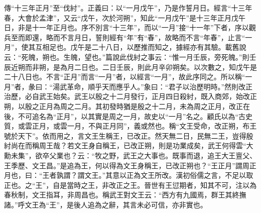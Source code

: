 {\noindent\zhuan{}\fzbyks 傳“十三年正月”至“伐紂”。正義曰：以“一月戊午”，乃是作誓月日。經言“十三年春，大會於孟津”，又云“戊午，次於河朔”，知此“一月戊午”是十三年正月戊午日，非是十一年正月也。序不別言“十三年”，而以“一月”接“十一年”下者，序以觀兵至而即還，略而不言月日，誓則經有“年”有“春”，故略而不言“年春”，止言“一月”，使其互相足也。戊午是二十八日，以歷推而知之，據經亦有其驗。載舊說云：“死魄，朔也。生魄，望也。”篇說此伐紂之事云：“惟一月壬辰，旁死魄。”則壬辰近朔而非朔，是為月二日也。二日壬辰，則此月辛卯朔矣。以次數之，知戊午是二十八日也。不言“正月”而言“一月”者，以經言“一月”，故此序同之。所以稱“一月”者，彖曰：“湯武革命，順乎天而應乎人。”象曰：“君子以治歷明時。”然則改正治歷，必自武王始矣。武王以殷之十二月發行，正月四日殺紂，既入商郊，始改正朔，以殷之正月為周之二月。其初發時猶是殷之十二月，未為周之正月，改正在後，不可追名為“正月”，以其實是周之一月，故史以“一月”名之。顧氏以為“古史質，或雲正月，或雲一月，不與正月同”，義或然也。稱“文王受命，改正朔，布王號於天下”。依而用之，言文王生稱王，已改正。然天無二日，民無二王，豈得殷紂尚在而稱周王哉？若文王身自稱王，已改正朔，則是功業成矣，武王何得雲“大勳未集”，欲卒父業也？云：“牧之野，武王之大事也。既事而退，追王大王亶父、王季歷、文王昌。”是追為王，何以得為文王身稱王，已改正朔也？“王正月”謂周正月也，曰：“王者孰謂？謂文王。”其意以正為文王所改。漢初俗儒之言，不足以取正也。之“王”，自是當時之王，非改正之王。晉世有王愆期者，知其不可，注以為春秋制，文王指耳，非周昌也。稱武王對文王云：“西方有九國焉，群王其終撫諸。”呼文王為“王”，是後人追為之辭，其言未必可信，亦非實也。 \par}

